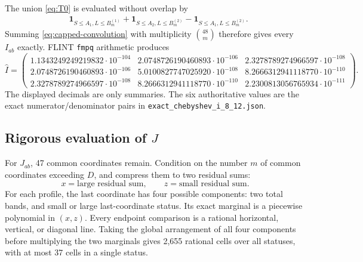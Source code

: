 \documentclass[11pt]{article}
\theoremstyle{definition}
\theoremstyle{remark}
\newcommand{\one}{\mathbf 1}
\begin{document}
The union \eqref{eq:T0} is evaluated without overlap by
\begin{align*}
 &\one_{S\leq A_1,L\leq B^{(1)}_m}
 +\one_{S\leq A_2,L\leq B^{(2)}_m}
 -\one_{S\leq A_1,L\leq B^{(2)}_m}.
\end{align*}
Summing \eqref{eq:capped-convolution} with multiplicity \(\binom{48}{m}\)
therefore gives every \(I_{ab}\) exactly.  FLINT \texttt{fmpq} arithmetic
produces
\begin{equation}
\label{eq:Imatrix}
\widehat I=\begin{pmatrix}
1.1343249249219832\!\cdot10^{-104}&2.0748726190460893\!\cdot10^{-106}&2.3278789274966597\!\cdot10^{-108}\\
2.0748726190460893\!\cdot10^{-106}&5.0100827747025920\!\cdot10^{-108}&8.2666312941118770\!\cdot10^{-110}\\
2.3278789274966597\!\cdot10^{-108}&8.2666312941118770\!\cdot10^{-110}&2.2300813056765934\!\cdot10^{-111}
\end{pmatrix}.
\end{equation}
The displayed decimals are only summaries.  The six authoritative values are
the exact numerator/denominator pairs in
\texttt{exact\_chebyshev\_i\_8\_12.json}.

\subsection{Rigorous evaluation of \(J\)}

For \(J_{ab}\), 47 common coordinates remain.  Condition on the number \(m\)
of common coordinates exceeding \(D\), and compress them to two residual
sums:
\[
 x=\text{large residual sum},\qquad
 z=\text{small residual sum}.
\]
For each profile, the last coordinate has four possible components: two total
bands, and small or large last-coordinate status.  Its exact marginal is a
piecewise polynomial in \((x,z)\).  Every endpoint comparison is a rational
horizontal, vertical, or diagonal line.  Taking the global arrangement of all
four components before multiplying the two marginals gives 2,655 rational
cells over all statuses, with at most 37 cells in a single status.
\end{document}
